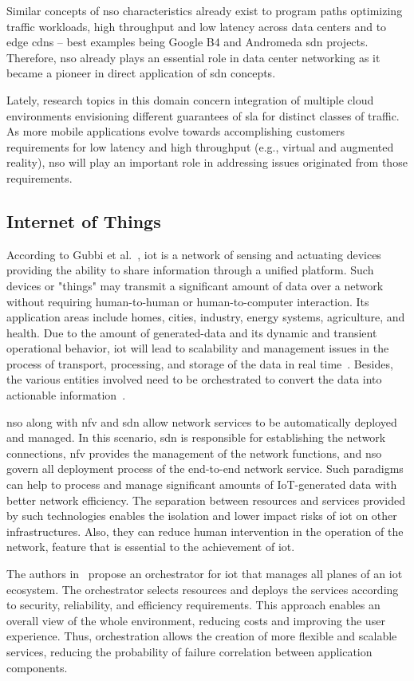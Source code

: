 Similar concepts of \gls{nso} characteristics already exist to program paths optimizing traffic workloads, high throughput and low latency across data centers and to edge \glspl{cdn} -- best examples being Google B4 and Andromeda \gls{sdn} projects. Therefore, \gls{nso} already plays an essential role in data center networking as it became a pioneer in direct application of \gls{sdn} concepts. 

Lately, research topics in this domain concern integration of multiple cloud environments envisioning different guarantees of \gls{sla} for distinct classes of traffic. As more mobile applications evolve towards accomplishing customers requirements for low latency and high throughput (e.g., virtual and augmented reality), \gls{nso} will play an important role in addressing issues originated from those requirements.  

\subsection{Internet of Things}
According to Gubbi et al.~\cite{Gubbi2013InternetDirections}, \gls{iot} is a network of sensing and actuating devices providing the ability to share information through a unified platform. Such devices or "things" may transmit a significant amount of data over a network without requiring human-to-human or human-to-computer interaction. Its application areas include homes, cities, industry, energy systems, agriculture, and health. Due to the amount of generated-data and its dynamic and transient operational behavior, \gls{iot} will lead to scalability and management issues in the process of transport, processing, and storage of the data in real time~\cite{Mijumbi2016NetworkChallenges}. Besides, the various entities involved need to be orchestrated to convert the data into actionable information~\cite{Consel2017InternetOrchestration}. 

\gls{nso} along with \gls{nfv} and \gls{sdn} allow network services to be automatically deployed and managed. In this scenario, \gls{sdn} is responsible for establishing the network connections, \gls{nfv} provides the management of the network functions, and \gls{nso} govern all deployment process of the end-to-end network service. Such paradigms can help to process and manage significant amounts of IoT-generated data with better network efficiency. The separation between resources and services provided by such technologies enables the isolation and lower impact risks of \gls{iot} on other infrastructures. Also, they can reduce human intervention in the operation of the network, feature that is essential to the achievement of \acrlong{iot}.

The authors in~\cite{Wen2017FogServices} propose an orchestrator for \acrlong{iot} that manages all planes of an \gls{iot} ecosystem. The orchestrator selects resources and deploys the services according to security, reliability, and efficiency requirements. This approach enables an overall view of the whole environment, reducing costs and improving the user experience. Thus, orchestration allows the creation of more flexible and scalable services, reducing the probability of failure correlation between application components. 